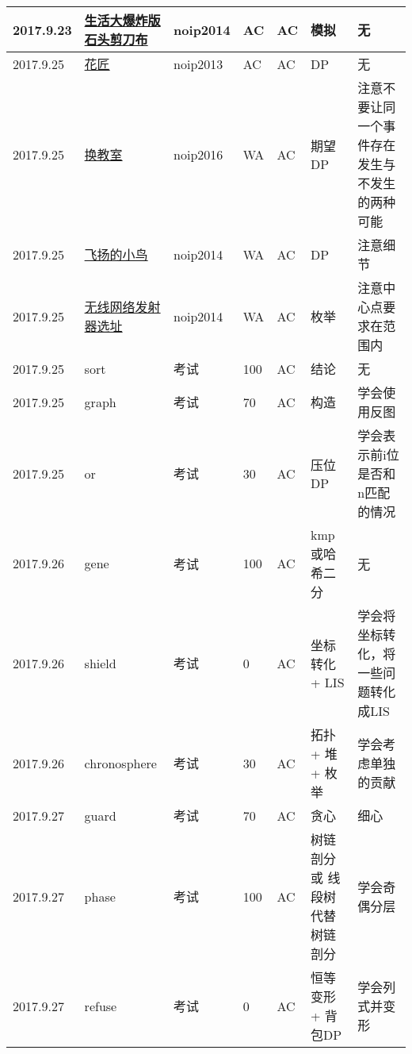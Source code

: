 \documentclass[a4paper]{article}
\begin{document}
\begin{longtable}{|p{1.5cm}|p{2.5cm}|p{1.6cm}|p{1.6cm}|p{1cm}|p{3cm}|p{4cm}|}
		\hline
		2017.9.23 & \href {https://www.luogu.org/problem/show?pid=1328#sub}{生活大爆炸版石头剪刀布}
		 & noip2014 & AC & AC & 模拟 & 无\\
		
		\hline
		2017.9.25 & \href {https://www.luogu.org/problem/show?pid=1970#sub}{花匠}
		 & noip2013 & AC & AC & DP & 无\\

		\hline
		2017.9.25 & \href {https://www.luogu.org/problem/show?pid=1850#sub}{换教室}
		 & noip2016 & WA & AC & 期望DP & 注意不要让同一个事件存在发生与不发生的两种可能\\
		
		\hline
		2017.9.25 & \href {https://www.luogu.org/problem/show?pid=1941#sub}{飞扬的小鸟}
		 & noip2014 & WA & AC & DP & 注意细节\\
		
		\hline
		2017.9.25 & \href {https://www.luogu.org/problem/show?pid=2038#sub}{无线网络发射器选址}
		 & noip2014 & WA & AC & 枚举 & 注意中心点要求在范围内\\
		
		\hline
		2017.9.25 & sort
		 & 考试 & 100 & AC & 结论 & 无\\
		
		\hline
		2017.9.25 & graph
		 & 考试 & 70 & AC & 构造 & 学会使用反图\\
		
		\hline
		2017.9.25 & or
		 & 考试 & 30 & AC & 压位DP & 学会表示前i位是否和n匹配的情况\\
		
		\hline
		2017.9.26 & gene
		 & 考试 & 100 & AC & kmp或哈希二分 & 无\\
		
		\hline
		2017.9.26 & shield
		 & 考试 & 0 & AC & 坐标转化 + LIS & 学会将坐标转化，将一些问题转化成LIS\\
		
		\hline
		2017.9.26 & chronosphere
		 & 考试 & 30 & AC & 拓扑 + 堆 + 枚举 & 学会考虑单独的贡献\\
		
		\hline
		2017.9.27 & guard
		 & 考试 & 70 & AC & 贪心 & 细心\\
		
		\hline
		2017.9.27 & phase
		 & 考试 & 100 & AC & 树链剖分 或 线段树代替树链剖分 & 学会奇偶分层\\
		
		\hline
		2017.9.27 & refuse
		 & 考试 & 0 & AC & 恒等变形 + 背包DP & 学会列式并变形\\


\end{longtable}
\end{document}
